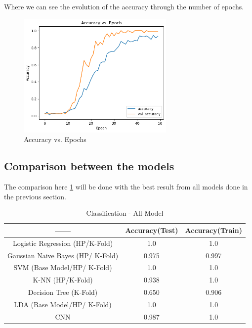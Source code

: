 \documentclass[conference]{IEEEtran}
\begin{document}
Where we can see the evolution of the accuracy through the number of epochs.

\begin{figure}
    \centering
    \includegraphics[width=3in]{cnn/1.png}
    \caption{Accuracy vs. Epochs}
    \label{fig:my_label}
\end{figure}



\subsection{Comparison between the models}

The comparison here \ref{tab:tab_comp_final} will be done with the best result from all models done in the previous section.

\begin{table}[ht!]
    \centering
    \caption{Classification - All Model} 
    \begin{tabular}{||c| c | c ||} 
    \hline
     ------ & Accuracy(Test) & Accuracy(Train) \\ [0.3ex] 
     \hline\hline
     Logistic Regression (HP/K-Fold) & 1.0 & 1.0\\
     \hline
    Gaussian Naive Bayes (HP/ K-Fold) & 0.975 &  0.997\\ 
    \hline
    SVM (Base Model/HP/ K-Fold) & 1.0 & 1.0 \\ 
    \hline
    K-NN (HP/K-Fold) & 0.938 & 1.0 \\ 
    \hline
    Decision Tree (K-Fold) & 0.650 & 0.906\\ 
    \hline
    LDA (Base Model/HP/ K-Fold) & 1.0 & 1.0\\ 
    \hline
    CNN  & 0.987 & 1.0\\ 
    \hline
    \end{tabular}
    \label{tab:tab_comp_final}
\end{table}
\end{document}
